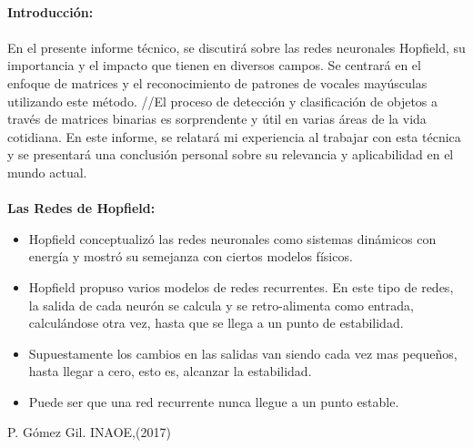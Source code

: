 \documentclass{article}
\begin{document}
\maketitle
\textsf{\ \\
\textbf{Introducción:}\\
\\
En el presente informe técnico, se discutirá sobre las redes neuronales Hopfield, su importancia y el impacto que tienen en diversos campos. Se centrará en el enfoque de matrices y el reconocimiento de patrones de vocales mayúsculas utilizando este método.
//El proceso de detección y clasificación de objetos a través de matrices binarias es sorprendente y útil en varias áreas de la vida cotidiana. En este informe, se relatará mi experiencia al trabajar con esta técnica y se presentará una conclusión personal sobre su relevancia y aplicabilidad en el mundo actual. \\}
\\
\textbf{Las Redes de Hopfield:}
\begin{itemize}
    \item Hopfield conceptualizó las redes neuronales como
        sistemas dinámicos con energía y mostró su
        semejanza con ciertos modelos físicos.

    \item Hopfield propuso varios modelos de redes
recurrentes. En este tipo de redes, la salida de cada
neurón se calcula y se retro-alimenta como entrada,
calculándose otra vez, hasta que se llega a un punto
de estabilidad. 
    \item Supuestamente los cambios en las salidas van
siendo cada vez mas pequeños, hasta llegar a cero,
esto es, alcanzar la estabilidad.
    \item Puede ser que una red recurrente nunca llegue a un
punto estable.   
\end{itemize}
\textsf{P. Gómez Gil. INAOE,(2017)}
\\
\end{document}
